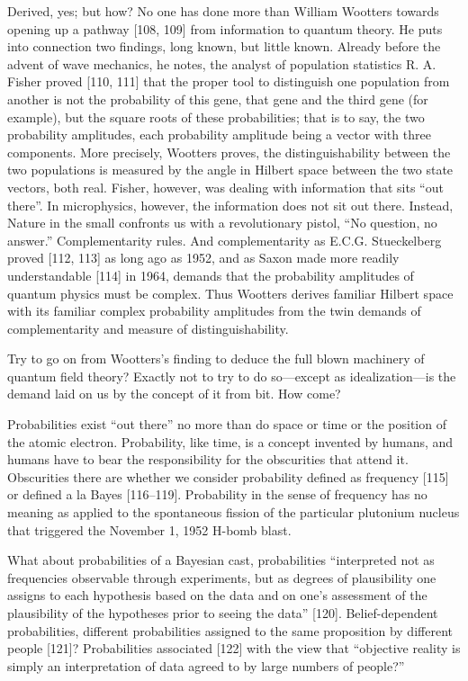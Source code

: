 \documentclass[11pt]{article}
\begin{document}
	Derived, yes; but how? No one has done more than William Wootters towards
	opening up a pathway [108, 109] from information to quantum theory. He puts
	into connection two findings, long known, but little known. Already before the
	advent of wave mechanics, he notes, the analyst of population statistics R. A. Fisher
	proved [110, 111] that the proper tool to distinguish one population from another is
	not the probability of this gene, that gene and the third gene (for example), but the
	square roots of these probabilities; that is to say, the two probability amplitudes,
	each probability amplitude being a vector with three components. More precisely,
	Wootters proves, the distinguishability between the two populations is measured by
	the angle in Hilbert space between the two state vectors, both real. Fisher, however,
	was dealing with information that sits ``out there''. In microphysics, however, the
	information does not sit out there. Instead, Nature in the small confronts us with
	a revolutionary pistol, ``No question, no answer.'' Complementarity rules. And
	complementarity as E.C.G. Stueckelberg proved [112, 113] as long ago as 1952,
	and as Saxon made more readily understandable [114] in 1964, demands that the
	probability amplitudes of quantum physics must be complex. Thus Wootters derives
	familiar Hilbert space with its familiar complex probability amplitudes from the twin
	demands of complementarity and measure of distinguishability.
	
	Try to go on from Wootters's finding to deduce the full blown machinery of
	quantum field theory? Exactly not to try to do so---except as idealization---is
	the demand laid on us by the concept of it from bit. How come?
	
	Probabilities exist ``out there'' no more than do space or time or the position of
	the atomic electron. Probability, like time, is a concept invented by humans, and
	humans have to bear the responsibility for the obscurities that attend it. Obscurities
	there are whether we consider probability defined as frequency [115] or defined a la
	Bayes [116--119]. Probability in the sense of frequency has no meaning as applied
	to the spontaneous fission of the particular plutonium nucleus that triggered the
	November 1, 1952 H-bomb blast.
	
	What about probabilities of a Bayesian cast, probabilities ``interpreted not as frequencies observable through experiments, but as degrees of plausibility one assigns
	to each hypothesis based on the data and on one's assessment of the plausibility
	of the hypotheses prior to seeing the data'' [120]. Belief-dependent probabilities,
	different probabilities assigned to the same proposition by different people [121]?
	Probabilities associated [122] with the view that ``objective reality is simply an
	interpretation of data agreed to by large numbers of people?''
	
\end{document}

